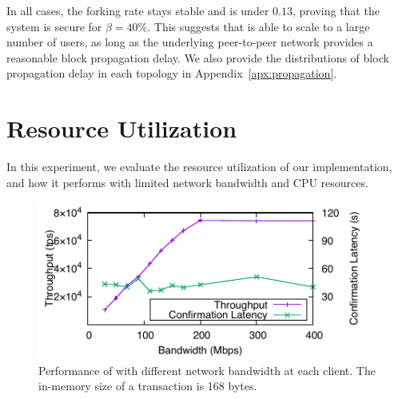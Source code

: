 In all cases, the forking rate stays stable and is under $0.13$, proving that the system is secure for $\beta=40\%$. This suggests that \prism is able to scale to a large number of users, as long as the underlying peer-to-peer network provides a reasonable block propagation delay. We also provide the distributions of block propagation delay in each topology in Appendix~\ref{apx:propagation}.

\section{Resource Utilization}
\label{sec:eval-resource}

In this experiment, we evaluate the resource utilization of our \prism implementation, and how it performs with limited network bandwidth and CPU resources. 





\begin{figure}
    \centering
    \includegraphics{figures/resource-fig-bw.pdf}
        \vspace{-2mm}
    \caption{\small Performance of \prism with different network bandwidth at each client. The in-memory size of a transaction is 168 bytes.}
    \label{fig:bw}
    \vspace{-2mm}
\end{figure}

